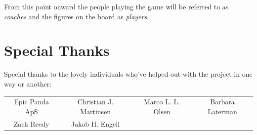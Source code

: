 \documentclass[a4paper]{book}
\begin{document}
\begin{note}
    From this point onward the people playing the game will be referred to as \textit{coaches} and the figures on the board as \textit{players}.
\end{note}

\section*{Special Thanks}
Special thanks to the lovely individuals who've helped out with the project in one way or another:
\begin{center}
    \begin{tabular}{cccc}
        Epic Panda ApS & Christian J. Martinsen & Marco L. L. Olsen & Barbara Laterman \\ Zach Reedy & Jakob H. Engell\\
    \end{tabular}
\end{center}

\tableofcontents
\mainmatter


\appendix
%
%
\end{document}
